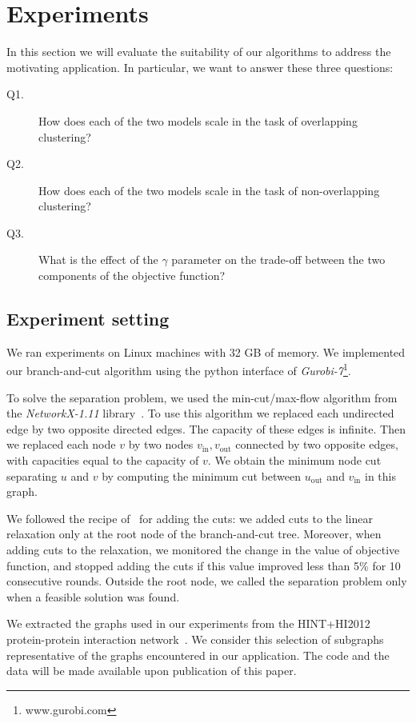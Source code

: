 \documentclass[conference]{IEEEtran}
\newcommand{\NDTi}[1]{\todo[inline,bordercolor=ghue,color=ghue!40]{Tias: #1}}
\begin{document}
\section{Experiments}
\label{sec:experiments}

In this section we will evaluate the suitability of our algorithms to address the motivating application. In particular, we want to answer these three questions:

\begin{description}
\item[Q1.] How does each of the two models scale in the task of overlapping clustering?
\item[Q2.] How does each of the two models scale in the task of non-overlapping clustering?
\item[Q3.] What is the effect of the $\gamma$ parameter on the trade-off between the two components of the objective function?
\end{description}


\subsection{Experiment setting}
We ran experiments on Linux machines with 32 GB of memory. We implemented our branch-and-cut algorithm using the python interface
of \emph{Gurobi-7}\footnote{www.gurobi.com}.

To solve the separation problem, we used the min-cut/max-flow algorithm from the \emph{NetworkX-1.11} library~\cite{NetworkX}. To use this algorithm we replaced
each undirected edge by two opposite directed edges. The capacity of
these edges is infinite. Then we replaced each node $v$ by two
nodes $v_{\text{in}}, v_{\text{out}}$ connected by two opposite
edges, with capacities equal to the capacity of $v$. We obtain the
minimum node cut separating $u$ and $v$ by computing the minimum cut
between $u_{\text{out}}$ and $v_{\text{in}}$ in this graph.

We followed the recipe of~\cite{CarvajalCGVW13} for adding the cuts: we added cuts to the
linear relaxation only at the root node of the branch-and-cut tree.
Moreover, when adding cuts to the relaxation, we monitored the change in
the value of objective function, and stopped adding the cuts if this
value improved less than 5\% for 10 consecutive rounds. Outside the root
node, we called the separation problem only when a feasible solution was
found.

We extracted the graphs used in our experiments from the HINT+HI2012 protein-protein interaction network~\cite{das2012hint,yu2011next}. We consider this selection of subgraphs representative of the graphs encountered in our application.
%
\NDTi{for Behrouz: something about the data}
The code and the data will be made available upon publication of this paper.
\end{document}
